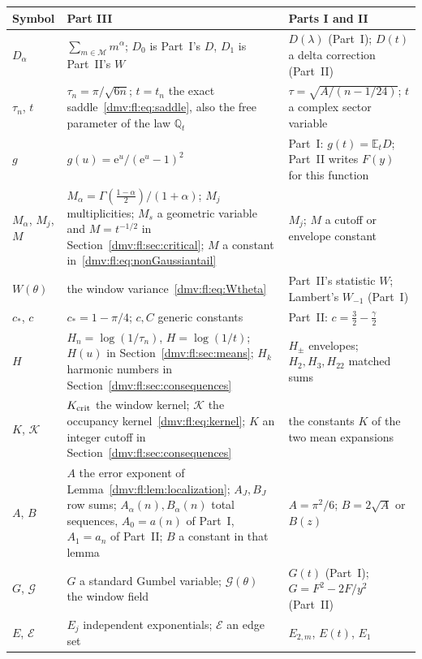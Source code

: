 \documentclass[11pt,letterpaper]{article}
\numberwithin{equation}{section}
\theoremstyle{definition}\newtheorem{definition}[theorem]{Definition}
\theoremstyle{remark}\newtheorem{remark}[theorem]{Remark}
\newcommand{\E}{\mathbb E}
\newcommand{\ee}{\mathrm e}
\newcommand{\Q}{\mathbb Q}
\begin{document}
\begingroup\small
\renewcommand{\arraystretch}{1.1}
\renewcommand{\theHtable}{dmvfl.notation}%
\begin{longtable}{@{}>{\raggedright\arraybackslash}p{0.75in}>{\raggedright\arraybackslash}p{2.75in}>{\raggedright\arraybackslash}p{2.35in}@{}}
\toprule
Symbol & Part III & Parts I and II\\
\midrule
\endhead
$D_\alpha$ & $\sum_{m\in\mathcal M}m^\alpha$; $D_0$ is Part~I's $D$, $D_1$ is Part~II's $W$ & $D(\lambda)$ (Part~I); $D(t)$ a delta correction (Part~II)\\
$\tau_n$, $t$ & $\tau_n=\pi/\sqrt{6n}$; $t=t_n$ the exact saddle~\eqref{dmv:fl:eq:saddle}, also the free parameter of the law $\Q_t$ & $\tau=\sqrt{A/(n-1/24)}$; $t$ a complex sector variable\\
$g$ & $g(u)=\ee^u/(\ee^u-1)^2$ & Part~I: $g(t)=\E_tD$; Part~II writes $F(y)$ for this function\\
$M_\alpha$, $M_j$, $M$ & $M_\alpha=\Gamma(\frac{1-\alpha}2)/(1+\alpha)$; $M_j$ multiplicities; $M_s$ a geometric variable and $M=t^{-1/2}$ in Section~\ref{dmv:fl:sec:critical}; $M$ a constant in~\eqref{dmv:fl:eq:nonGaussiantail} & $M_j$; $M$ a cutoff or envelope constant\\
$W(\theta)$ & the window variance~\eqref{dmv:fl:eq:Wtheta} & Part~II's statistic $W$; Lambert's $W_{-1}$ (Part~I)\\
$c_*$, $c$ & $c_*=1-\pi/4$; $c,C$ generic constants & Part~II: $c=\frac32-\frac\gamma2$\\
$H$ & $H_n=\log(1/\tau_n)$, $H=\log(1/t)$; $H(u)$ in Section~\ref{dmv:fl:sec:means}; $H_k$ harmonic numbers in Section~\ref{dmv:fl:sec:consequences} & $H_\pm$ envelopes; $H_2,H_3,H_{22}$ matched sums\\
$K$, $\mathcal K$ & $K_{\rm crit}$ the window kernel; $\mathcal K$ the occupancy kernel~\eqref{dmv:fl:eq:kernel}; $K$ an integer cutoff in Section~\ref{dmv:fl:sec:consequences} & the constants $K$ of the two mean expansions\\
$A$, $B$ & $A$ the error exponent of Lemma~\ref{dmv:fl:lem:localization}; $A_J,B_J$ row sums; $A_\alpha(n),B_\alpha(n)$ total sequences, $A_0=a(n)$ of Part~I, $A_1=a_n$ of Part~II; $B$ a constant in that lemma & $A=\pi^2/6$; $B=2\sqrt A$ or $B(z)$\\
$G$, $\mathcal G$ & $G$ a standard Gumbel variable; $\mathcal G(\theta)$ the window field & $G(t)$ (Part~I); $G=F^2-2F/y^2$ (Part~II)\\
$E$, $\mathcal E$ & $E_j$ independent exponentials; $\mathcal E$ an edge set & $E_{2,m}$, $E(t)$, $E_1$\\

\end{longtable}
\end{document}
